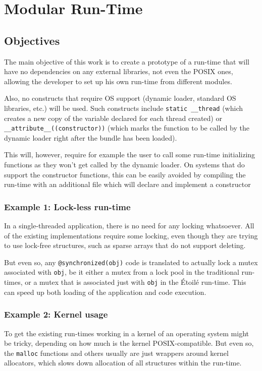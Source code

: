 \chapter{Modular Run-Time}
\section{Objectives}

The main objective of this work is to create a prototype of a run-time that will have no dependencies on any external libraries, not even the POSIX ones, allowing the developer to set up his own run-time from different modules.

Also, no constructs that require OS support (dynamic loader, standard OS libraries, etc.) will be used. Such constructs include \verb=static __thread= (which creates a new copy of the variable declared for each thread created) or \newline \verb=__attribute__((constructor))= (which marks the function to be called by the dynamic loader right after the bundle has been loaded).

This will, however, require for example the user to call some run-time initializing functions as they won't get called by the dynamic loader. On systems that do support the constructor functions, this can be easily avoided by compiling the run-time with an additional file which will declare and implement a constructor 

\subsection{Example 1: Lock-less run-time}
In a single-threaded application, there is no need for any locking whatsoever. All of the existing implementations require some locking, even though they are trying to use lock-free structures, such as sparse arrays that do not support deleting.

But even so, any \verb=@synchronized(obj)= code is translated to actually lock a mutex associated with \verb=obj=, be it either a mutex from a lock pool in the traditional run-times, or a mutex that is associated just with \verb=obj= in the \'Etoil\'e run-time. This can speed up both loading of the application and code execution.

\subsection{Example 2: Kernel usage}

To get the existing run-times working in a kernel of an operating system might be tricky, depending on how much is the kernel POSIX-compatible. But even so, the \verb=malloc= functions and others usually are just wrappers around kernel allocators, which slows down allocation of all structures within the run-time.

